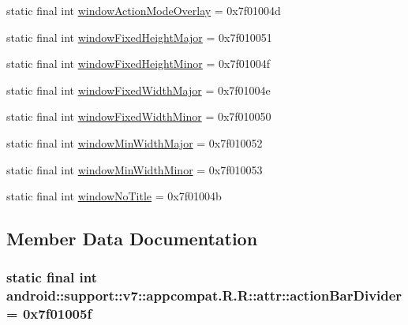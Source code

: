 \begin{CompactItemize}
\item 
static final int \hyperlink{classandroid_1_1support_1_1v7_1_1appcompat_1_1_r_1_1attr_01586bd7b1fbd6c70589b76af0f9c8fb}{windowActionModeOverlay} = 0x7f01004d
\item 
static final int \hyperlink{classandroid_1_1support_1_1v7_1_1appcompat_1_1_r_1_1attr_a88c86c89d381e31186c64bd3205101c}{windowFixedHeightMajor} = 0x7f010051
\item 
static final int \hyperlink{classandroid_1_1support_1_1v7_1_1appcompat_1_1_r_1_1attr_289d25f6cbbed4f50295c450aa7b8970}{windowFixedHeightMinor} = 0x7f01004f
\item 
static final int \hyperlink{classandroid_1_1support_1_1v7_1_1appcompat_1_1_r_1_1attr_619558789fddcc533fa0c9d5207575f2}{windowFixedWidthMajor} = 0x7f01004e
\item 
static final int \hyperlink{classandroid_1_1support_1_1v7_1_1appcompat_1_1_r_1_1attr_3e6187b6b920a88b888b39cb2101d409}{windowFixedWidthMinor} = 0x7f010050
\item 
static final int \hyperlink{classandroid_1_1support_1_1v7_1_1appcompat_1_1_r_1_1attr_807276ccffe6f2e6a24c4ed476325aba}{windowMinWidthMajor} = 0x7f010052
\item 
static final int \hyperlink{classandroid_1_1support_1_1v7_1_1appcompat_1_1_r_1_1attr_33cce245f8ff93ab2e9c7d42a9d2b3a6}{windowMinWidthMinor} = 0x7f010053
\item 
static final int \hyperlink{classandroid_1_1support_1_1v7_1_1appcompat_1_1_r_1_1attr_33ab908bf294c88988778e867e8c4602}{windowNoTitle} = 0x7f01004b
\end{CompactItemize}


\subsection{Member Data Documentation}
\hypertarget{classandroid_1_1support_1_1v7_1_1appcompat_1_1_r_1_1attr_c9199392bf3e36a0efdac1749c98882b}{
\subsubsection[{actionBarDivider}]{\setlength{\rightskip}{0pt plus 5cm}static final int android::support::v7::appcompat.R.R::attr::actionBarDivider = 0x7f01005f}}
\label{classandroid_1_1support_1_1v7_1_1appcompat_1_1_r_1_1attr_c9199392bf3e36a0efdac1749c98882b}


